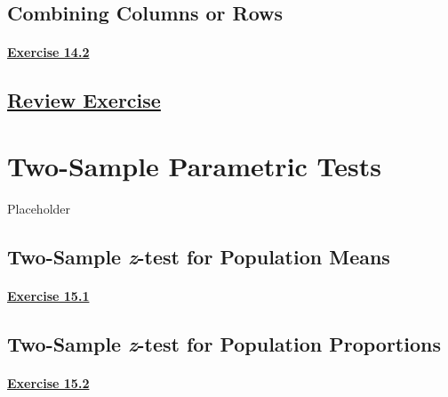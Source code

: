 \documentclass[
  11pt,
]{book}
\begin{document}
\section{Combining Columns or Rows}\label{combining-columns-or-rows}

\subsubsection*{\texorpdfstring{\hyperref[ex142a]{Exercise 14.2}}{Exercise 14.2}}\label{exercise-14.2}

\section*{\texorpdfstring{\hyperref[re14a]{Review Exercise}}{Review Exercise}}\label{review-exercise-13}

\chapter{Two-Sample Parametric Tests}\label{two-sample-parametric-tests}

Placeholder

\section{\texorpdfstring{Two-Sample \textit{z}-test for Population Means}{Two-Sample -test for Population Means}}\label{two-sample--test-for-population-means}

\subsubsection*{\texorpdfstring{\hyperref[ex151a]{Exercise 15.1}}{Exercise 15.1}}\label{exercise-15.1}

\section{\texorpdfstring{Two-Sample \textit{z}-test for Population Proportions}{Two-Sample -test for Population Proportions}}\label{two-sample--test-for-population-proportions}

\subsubsection*{\texorpdfstring{\hyperref[ex152a]{Exercise 15.2}}{Exercise 15.2}}\label{exercise-15.2}
\end{document}

